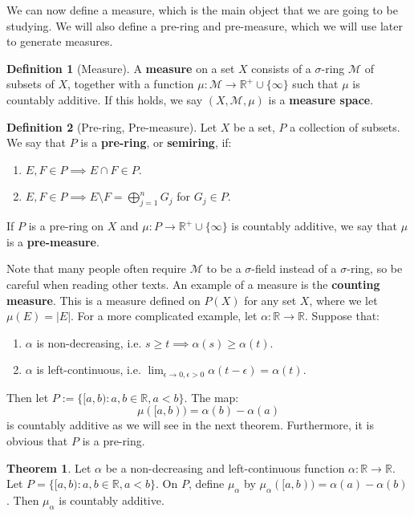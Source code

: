 \documentclass[11pt, oneside]{amsart}   	%
\theoremstyle{definition}
\newtheorem{definition}{Definition}[section]
\newtheorem{theorem}{Theorem}[section]
\begin{document}
	We can now define a measure, which is the main object that we are going to be studying. We will also define a pre-ring 
	and pre-measure, which we will use later to generate measures.
	
	\begin{definition}[Measure]
		A \textbf{measure} on a set $X$ consists of a $\sigma$-ring $\mathcal M$ of subsets of $X$, together with a 
		function $\mu : \mathcal M\rightarrow\mathbb R^+\cup\{\infty\}$ such that $\mu$ is countably additive. If this holds, 
		we say $(X, \mathcal M, \mu)$ is a \textbf{measure space}.
	\end{definition}
	
	\begin{definition}[Pre-ring, Pre-measure]
		Let $X$ be a set, $P$ a collection of subsets. We say that $P$ is a \textbf{pre-ring}, or \textbf{semiring}, if:
		\begin{enumerate}
			\item $E, F\in P\implies E\cap F\in P$. 
			\item $E, F\in P\implies E\setminus F = \bigoplus_{j = 1}^n G_j$ for $G_j\in P$. 
		\end{enumerate}
		If $P$ is a pre-ring on $X$ and $\mu : P\rightarrow\mathbb R^+\cup\{\infty\}$ is countably additive, we say that 
		$\mu$ is a \textbf{pre-measure}.
	\end{definition}
	
	Note that many people often require $\mathcal M$ to be a $\sigma$-field instead of a $\sigma$-ring, so be careful when 
	reading other texts. An example of a measure is the \textbf{counting measure}. This is a measure defined on $P(X)$ for 
	any set $X$, where we let $\mu(E) = |E|$. For a more complicated example, let $\alpha : \mathbb R\rightarrow \mathbb 
	R$. Suppose that:
	\begin{enumerate}
		\item $\alpha$ is non-decreasing, i.e. $s\geq t\implies\alpha(s)\geq\alpha(t)$.
		\item $\alpha$ is left-continuous, i.e. $\lim_{\epsilon\rightarrow 0, \epsilon > 0}\alpha(t - \epsilon) = \alpha(t)$. 
	\end{enumerate}
	Then let $P := \{[a, b) : a, b\in\mathbb R, a < b\}$. The map:
	$$
		\mu([a, b)) = \alpha(b) - \alpha(a)
	$$
	is countably additive as we will see in the next theorem. Furthermore, it is obvious that $P$ is a pre-ring.
	
	\begin{theorem}
		Let $\alpha$ be a non-decreasing and left-continuous function $\alpha : \mathbb R\rightarrow\mathbb R$. Let $P = 
		\{[a, b) : a, b\in\mathbb R, a < b\}$. On $P$, define $\mu_\alpha$ by $\mu_\alpha([a, b)) = \alpha(a) - \alpha(b)$. 
		Then $\mu_\alpha$ is countably additive.
	\end{theorem}
	
\end{document}
